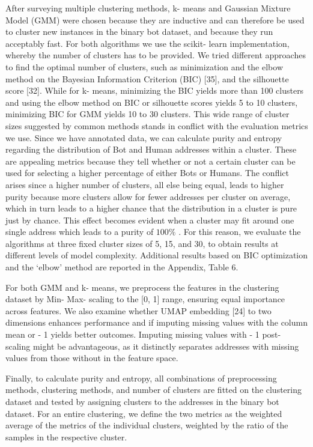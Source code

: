 After surveying multiple clustering methods, k- means and Gaussian Mixture Model (GMM) were chosen because they are inductive and can therefore be used to cluster new instances in the binary bot dataset, and because they run acceptably fast. For both algorithms we use the scikit- learn implementation, whereby the number of clusters has to be provided. We tried different approaches to find the optimal number of clusters, such as minimization and the elbow method on the Bayesian Information Criterion (BIC) [35], and the silhouette score [32]. While for k- means, minimizing the BIC yields more than 100 clusters and using the elbow method on BIC or silhouette scores yields 5 to 10 clusters, minimizing BIC for GMM yields 10 to 30 clusters. This wide range of cluster sizes suggested by common methods stands in conflict with the evaluation metrics we use. Since we have annotated data, we can calculate purity and entropy regarding the distribution of Bot and Human addresses within a cluster. These are appealing metrics because they tell whether or not a certain cluster can be used for selecting a higher percentage of either Bots or Humans. The conflict arises since a higher number of clusters, all else being equal, leads to higher purity because more clusters allow for fewer addresses per cluster on average, which in turn leads to a higher chance that the distribution in a cluster is pure just by chance. This effect becomes evident when a cluster may fit around one single address which leads to a purity of \(100\%\) . For this reason, we evaluate the algorithms at three fixed cluster sizes of 5, 15, and 30, to obtain results at different levels of model complexity. Additional results based on BIC optimization and the `elbow' method are reported in the Appendix, Table 6.

For both GMM and k- means, we preprocess the features in the clustering dataset by Min- Max- scaling to the [0, 1] range, ensuring equal importance across features. We also examine whether UMAP embedding [24] to two dimensions enhances performance and if imputing missing values with the column mean or - 1 yields better outcomes. Imputing missing values with - 1 post- scaling might be advantageous, as it distinctly separates addresses with missing values from those without in the feature space.

Finally, to calculate purity and entropy, all combinations of preprocessing methods, clustering methods, and number of clusters are fitted on the clustering dataset and tested by assigning clusters to the addresses in the binary bot dataset. For an entire clustering, we define the two metrics as the weighted average of the metrics of the individual clusters, weighted by the ratio of the samples in the respective cluster.

